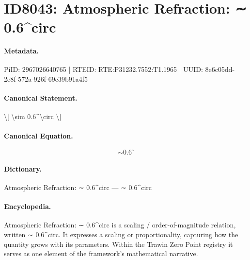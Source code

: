 \section*{ID8043: Atmospheric Refraction: ∼ 0.6\textasciicircum{}circ}
\paragraph{Metadata.}
PiID: 2967026640765 | RTEID: RTE:P31232.7552:T1.1965 | UUID: 8e6c05dd-2e8f-572a-926f-69c39b91a4f5

\paragraph{Canonical Statement.}
\textbackslash{}[ \textbackslash{}sim 0.6\textasciicircum{}\textbackslash{}circ \textbackslash{}]

\paragraph{Canonical Equation.}
\[
\sim 0.6^\circ
\]

\paragraph{Dictionary.}
Atmospheric Refraction: ∼ 0.6\textasciicircum{}circ — ∼ 0.6\textasciicircum{}circ

\paragraph{Encyclopedia.}
Atmospheric Refraction: ∼ 0.6\textasciicircum{}circ is a scaling / order-of-magnitude relation, written ∼ 0.6\textasciicircum{}circ. It expresses a scaling or proportionality, capturing how the quantity grows with its parameters. Within the Trawin Zero Point registry it serves as one element of the framework's mathematical narrative.
